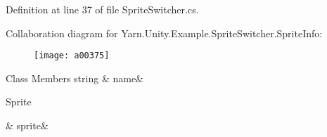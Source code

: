 Definition at line 37 of file Sprite\-Switcher.\-cs.



Collaboration diagram for Yarn.\-Unity.\-Example.\-Sprite\-Switcher.\-Sprite\-Info\-:
\nopagebreak
\begin{figure}[H]
\begin{center}
\leavevmode
\texttt{[image: a00375]}
\end{center}
\end{figure}
\begin{DoxyFields}{Class Members}
\hypertarget{a00157_a3f5bca2fff413dfe075c1fcf7e58369c}{string}\label{a00157_a3f5bca2fff413dfe075c1fcf7e58369c}
&
name&
\\
\hline

\hypertarget{a00157_adc58df011dc2841837b6cf775b372061}{Sprite}\label{a00157_adc58df011dc2841837b6cf775b372061}
&
sprite&
\\
\hline

\end{DoxyFields}
